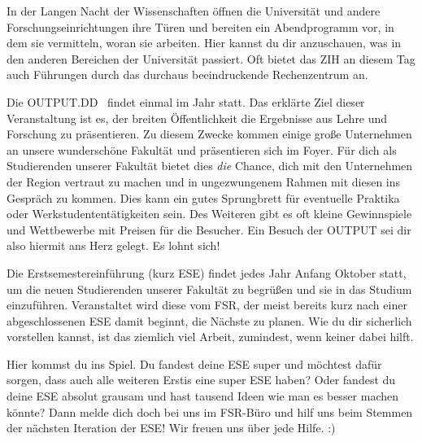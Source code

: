 
In der Langen Nacht der Wissenschaften öffnen die Universität und andere Forschungseinrichtungen ihre Türen und bereiten ein Abendprogramm vor, in dem sie vermitteln, woran sie arbeiten. Hier kannst du dir anzuschauen, was in den anderen Bereichen der Universität passiert. Oft bietet das ZIH an diesem Tag auch Führungen durch das durchaus beeindruckende Rechenzentrum an.


Die OUTPUT.DD~ findet einmal im Jahr statt. Das erklärte Ziel dieser Veranstaltung ist es, der breiten Öffentlichkeit die Ergebnisse aus Lehre und Forschung zu präsentieren. Zu diesem Zwecke kommen einige große Unternehmen an unsere wunderschöne Fakultät und präsentieren sich im Foyer. Für dich als Studierenden unserer Fakultät bietet dies \emph{die} Chance, dich mit den Unternehmen der Region vertraut zu machen und in ungezwungenem Rahmen mit diesen ins Gespräch zu kommen. Dies kann ein gutes Sprungbrett für eventuelle Praktika oder Werkstudententätigkeiten sein. Des Weiteren gibt es oft kleine Gewinnspiele und Wettbewerbe mit Preisen für die Besucher. Ein Besuch der OUTPUT sei dir also hiermit ans Herz gelegt. Es lohnt sich!


Die Erstsemestereinführung (kurz ESE) findet jedes Jahr Anfang Oktober statt, um die neuen Studierenden unserer Fakultät zu begrüßen und sie in das Studium einzuführen.
Veranstaltet wird diese vom FSR, der meist bereits kurz nach einer abgeschlossenen ESE damit beginnt, die Nächste zu planen.
Wie du dir sicherlich vorstellen kannst, ist das ziemlich viel Arbeit, zumindest, wenn keiner dabei hilft.

Hier kommst du ins Spiel. Du fandest deine ESE super und möchtest dafür sorgen, dass auch alle weiteren Erstis eine super ESE haben?
Oder fandest du deine ESE absolut grausam und hast tausend Ideen wie man es besser machen könnte?
Dann melde dich doch bei uns im FSR-Büro und hilf uns beim Stemmen der nächsten Iteration der ESE! Wir freuen uns über jede Hilfe. :)



